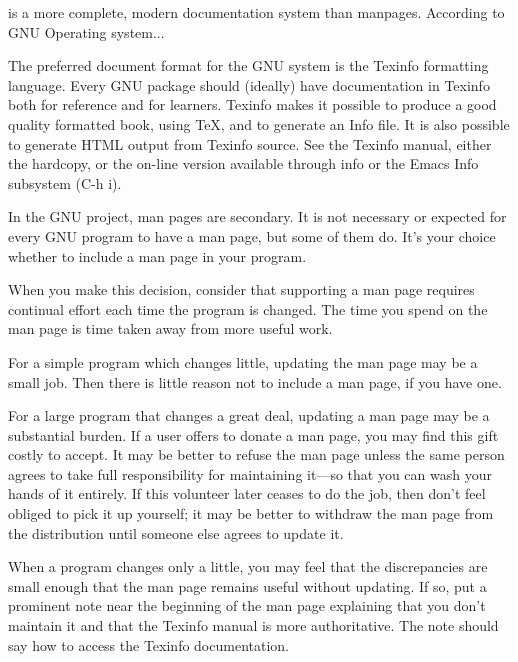  is a more complete, modern documentation system than manpages. According to GNU Operating system...

\begin{addmargin}[2em]{2em}
	The preferred document format for the GNU system is the Texinfo formatting language. Every GNU package should (ideally) have documentation in Texinfo both for reference and for learners. Texinfo makes it possible to produce a good quality formatted book, using TeX, and to generate an Info file. It is also possible to generate HTML output from Texinfo source. See the Texinfo manual, either the hardcopy, or the on-line version available through info or the Emacs Info subsystem (C-h i). 
	
	In the GNU project, man pages are secondary. It is not necessary or expected for every GNU program to have a man page, but some of them do. It's your choice whether to include a man page in your program.
	
	When you make this decision, consider that supporting a man page requires continual effort each time the program is changed. The time you spend on the man page is time taken away from more useful work.
	
	For a simple program which changes little, updating the man page may be a small job. Then there is little reason not to include a man page, if you have one.
	
	For a large program that changes a great deal, updating a man page may be a substantial burden. If a user offers to donate a man page, you may find this gift costly to accept. It may be better to refuse the man page unless the same person agrees to take full responsibility for maintaining it---so that you can wash your hands of it entirely. If this volunteer later ceases to do the job, then don't feel obliged to pick it up yourself; it may be better to withdraw the man page from the distribution until someone else agrees to update it.
	
	When a program changes only a little, you may feel that the discrepancies are small enough that the man page remains useful without updating. If so, put a prominent note near the beginning of the man page explaining that you don't maintain it and that the Texinfo manual is more authoritative. The note should say how to access the Texinfo documentation. 
\end{addmargin}

